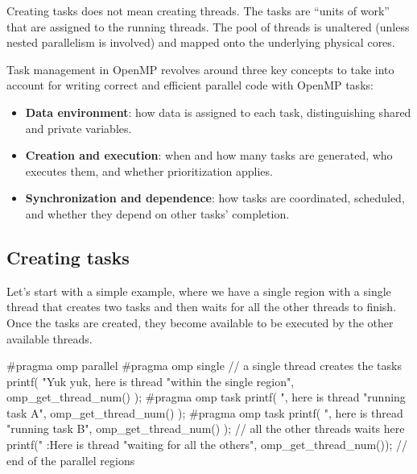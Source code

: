 \begin{observationblock}
Creating tasks does not mean creating threads. The tasks are “units of work” that are assigned to the running threads. The pool of threads is unaltered (unless nested parallelism is involved) and mapped onto the underlying physical cores.
\end{observationblock}

Task management in OpenMP revolves around three key concepts to take into account for writing correct and efficient parallel code with OpenMP tasks:
\begin{itemize}[noitemsep]
    \item \textbf{Data environment}: how data is assigned to each task, distinguishing shared and private variables.
    \item \textbf{Creation and execution}: when and how many tasks are generated, who executes them, and whether prioritization applies.
    \item \textbf{Synchronization and dependence}: how tasks are coordinated, scheduled, and whether they depend on other tasks' completion.
\end{itemize}
\subsection{Creating tasks}

Let's start with a simple example, where we have a single region with a single thread that creates two tasks and then waits for all the other threads to finish. Once the tasks are created, they become available to be executed by the other available threads.

\begin{codeblock}[language = C, morekeywords={pragma}]
#pragma omp parallel
{
    #pragma omp single // a single thread creates the tasks
    {
        printf( "Yuk yuk, here is thread %
            "within the single region\n", omp_get_thread_num() );
        #pragma omp task
        {
            printf( "\tHi, here is thread %
                "running task A\n", omp_get_thread_num() );
        }
        #pragma omp task
        {
            printf( "\tHi, here is thread %
                "running task B\n", omp_get_thread_num() );
        }
    } // all the other threads waits here
    printf(" :Here is thread %
        "waiting for all the others\n", omp_get_thread_num());
}	// end of the parallel regions	\
\end{codeblock}

